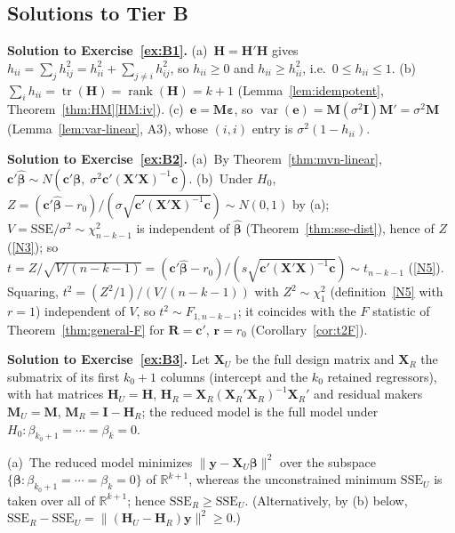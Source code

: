 \documentclass[12pt,a4paper]{article}
\theoremstyle{definition}
\DeclareMathOperator\var{var}
\DeclareMathOperator\tr{tr}
\DeclareMathOperator\rank{rank}
\newcommand{\SSE}{\mathrm{SSE}}
\newcommand{\bX}{\mathbf{X}}
\newcommand{\by}{\mathbf{y}}
\def\bb{\boldsymbol{\beta}}
\newcommand{\be}{\boldsymbol{\varepsilon}}
\newcommand{\bI}{\mathbf{I}}
\newcommand{\bH}{\mathbf{H}}
\newcommand{\bM}{\mathbf{M}}
\newcommand{\bR}{\mathbf{R}}
\newcommand{\br}{\mathbf{r}}
\def\bc{\mathbf{c}}
\newcommand{\Real}{\mathbb{R}}
\begin{document}
\subsection*{Solutions to Tier B}

\textbf{Solution to Exercise~\ref{ex:B1}.} (a)~$\bH = \bH'\bH$ gives $h_{ii} = \sum_j h_{ij}^2 = h_{ii}^2 + \sum_{j \neq i} h_{ij}^2$, so $h_{ii} \geqslant 0$ and $h_{ii} \geqslant h_{ii}^2$, i.e.\ $0 \leqslant h_{ii} \leqslant 1$. (b)~$\sum_i h_{ii} = \tr(\bH) = \rank(\bH) = k+1$ (Lemma~\ref{lem:idempotent}, Theorem~\ref{thm:HM}\ref{HM:iv}). (c)~$\mathbf{e} = \bM\be$, so $\var(\mathbf{e}) = \bM(\sigma^2\bI)\bM' = \sigma^2\bM$ (Lemma~\ref{lem:var-linear}, A3), whose $(i,i)$ entry is $\sigma^2(1 - h_{ii})$.

\textbf{Solution to Exercise~\ref{ex:B2}.} (a)~By Theorem~\ref{thm:mvn-linear}, $\bc'\hat{\bb} \sim N(\bc'\bb,\; \sigma^2\bc'(\bX'\bX)^{-1}\bc)$. (b)~Under $H_0$, $Z = (\bc'\hat{\bb} - r_0)/(\sigma\sqrt{\bc'(\bX'\bX)^{-1}\bc}) \sim N(0,1)$ by (a); $V = \SSE/\sigma^2 \sim \chi^2_{n-k-1}$ is independent of $\hat{\bb}$ (Theorem~\ref{thm:sse-dist}), hence of $Z$ (\ref{N3}); so $t = Z/\sqrt{V/(n-k-1)} = (\bc'\hat{\bb} - r_0)/(s\sqrt{\bc'(\bX'\bX)^{-1}\bc}) \sim t_{n-k-1}$ (\ref{N5}). Squaring, $t^2 = (Z^2/1)/(V/(n-k-1))$ with $Z^2 \sim \chi^2_1$ (definition~\ref{N5} with $r = 1$) independent of $V$, so $t^2 \sim F_{1,n-k-1}$; it coincides with the $F$ statistic of Theorem~\ref{thm:general-F} for $\bR = \bc'$, $\br = r_0$ (Corollary~\ref{cor:t2F}).

\textbf{Solution to Exercise~\ref{ex:B3}.} Let $\bX_U$ be the full design matrix and $\bX_R$ the submatrix of its first $k_0 + 1$ columns (intercept and the $k_0$ retained regressors), with hat matrices $\bH_U = \bH$, $\bH_R = \bX_R(\bX_R'\bX_R)^{-1}\bX_R'$ and residual makers $\bM_U = \bM$, $\bM_R = \bI - \bH_R$; the reduced model is the full model under $H_0\colon \beta_{k_0+1} = \cdots = \beta_k = 0$.

(a)~The reduced model minimizes $\|\by - \bX_U\bb\|^2$ over the subspace $\{\bb : \beta_{k_0+1} = \cdots = \beta_k = 0\}$ of $\Real^{k+1}$, whereas the unconstrained minimum $\SSE_U$ is taken over all of $\Real^{k+1}$; hence $\SSE_R \geqslant \SSE_U$. (Alternatively, by (b) below, $\SSE_R - \SSE_U = \|(\bH_U - \bH_R)\by\|^2 \geqslant 0$.)
\end{document}
